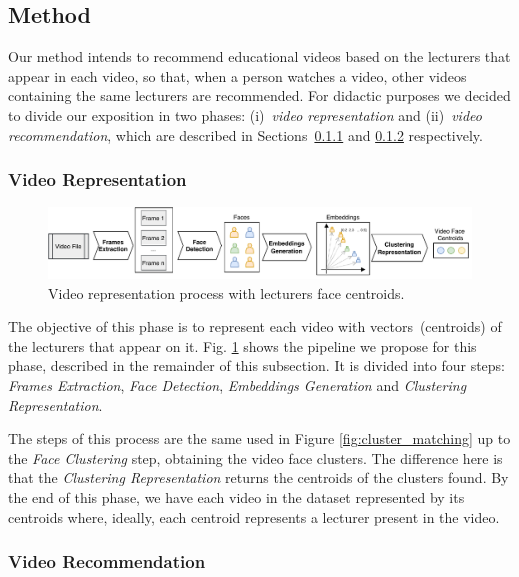 \subsection{Method}
\label{sec:ism_method}

Our method intends to recommend educational videos based on the lecturers that appear in each video, so that, when a person watches a video, other videos containing the same lecturers are recommended.
For didactic purposes we decided to divide our exposition in two phases: (i)~\emph{video representation} and (ii)~\emph{video recommendation}, which are described in Sections~\ref{subsec:video_representation} and \ref{subsec:video_recommendation} respectively.

\subsubsection{Video Representation}
\label{subsec:video_representation}

\begin{figure}[!ht]
  \centering
  \includegraphics[width=\linewidth]{img/ism/video_clustering_line.pdf}
  \caption{Video representation process with lecturers face centroids. }
  \label{fig:video_clustering}
\end{figure}

The objective of this phase is to represent each video with vectors~(centroids) of the lecturers that appear on it. 
Fig. \ref{fig:video_clustering} shows the pipeline we propose for this phase, described in the remainder of this subsection.
It is divided into four steps: \emph{Frames Extraction}, \emph{Face Detection}, \emph{Embeddings Generation} and \emph{Clustering Representation}.

The steps of this process are the same used in Figure \ref{fig:cluster_matching} up to the \emph{Face Clustering} step, obtaining the video face clusters.
The difference here is that the \emph{Clustering Representation} returns the centroids of the clusters found.
By the end of this phase, we have each video in the dataset represented by its centroids where, ideally, each centroid represents a lecturer present in the video.


\subsubsection{Video Recommendation}
\label{subsec:video_recommendation}

